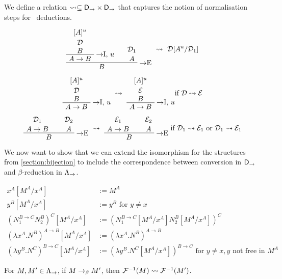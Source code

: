 \begin{definition}[Conversion]
We define a relation $\leadsto \subseteq \mathsf{D}_\to\times\mathsf{D}_\to$ that captures the notion of
normalisation steps for \implnpi\ deductions.

\[
  \AxiomC{$[A]^u$}
  \noLine
  \UnaryInfC{$\mathcal{D}$}
  \noLine
  \UnaryInfC{$B$}
  \RightLabel{$\to$I, $u$}
  \UnaryInfC{$A \to B$}
  \AxiomC{$\mathcal{D}_1$}
  \noLine
  \UnaryInfC{$A$}
  \RightLabel{$\to$E}
  \BinaryInfC{$B$}
  \DisplayProof
\ \leadsto\ \mathcal{D}[A^u/\mathcal{D}_1]
\]

\[
  \AxiomC{$[A]^u$}
  \noLine
  \UnaryInfC{$\mathcal{D}$}
  \noLine
  \UnaryInfC{$B$}
  \RightLabel{$\to$I, $u$}
  \UnaryInfC{$A \to B$}
  \DisplayProof
\ \leadsto\ 
  \AxiomC{$[A]^u$}
  \noLine
  \UnaryInfC{$\mathcal{E}$}
  \noLine
  \UnaryInfC{$B$}
  \RightLabel{$\to$I, $u$}
  \UnaryInfC{$A \to B$}
  \DisplayProof
\mbox{if } \mathcal{D} \leadsto \mathcal{E}
\]

\[
  \AxiomC{$\mathcal{D}_1$}
  \noLine
  \UnaryInfC{$A \to B$}
  \AxiomC{$\mathcal{D}_2$}
  \noLine
  \UnaryInfC{$A$}
  \RightLabel{$\to$E}
  \BinaryInfC{$B$}
  \DisplayProof
\ \leadsto\ 
  \AxiomC{$\mathcal{E}_1$}
  \noLine
  \UnaryInfC{$A \to B$}
  \AxiomC{$\mathcal{E}_2$}
  \noLine
  \UnaryInfC{$A$}
  \RightLabel{$\to$E}
  \BinaryInfC{$B$}
  \DisplayProof
\mbox{ if } \mathcal{D}_1 \leadsto \mathcal{E}_1
\mbox{ or } \mathcal{D}_1 \leadsto \mathcal{E}_1
\]
\end{definition}

We now want to show that we can extend the isomorphism for the structures from
\ref{section:bijection} to include the correspondence between conversion in
$\mathsf{D}_\to$ and $\beta$-reduction in $\Lambda_\to$.

\begin{definition}
\begin{align*}
x^A[M^A/x^A] & := M^A \\
y^B[M^A/x^A] & := y^B \mbox{ for } y \neq x \\
(N_1^{B \to C}N_2^{B})^C[M^A/x^A] & := (N_1^{B \to C}[M^A/x^A]N_2^{B}[M^A/x^A])^C \\
(\lambda x^A.N^B)^{A \to B}[M^A/x^A] & := (\lambda x^A.N^B)^{A \to B} \\
(\lambda y^B.N^C)^{B \to C}[M^A/x^A] & := (\lambda y^B.N^C[M^A/x^A])^{B \to C}
\mbox{ for } y \neq x, y \mbox{ not free in } M^A
\end{align*}
\end{definition}

\begin{proposition}
For $M, M' \in \Lambda_\to$, if $M \rightarrow_\beta M'$, then $\mathcal{F}^{-1}(M) \leadsto
\mathcal{F}^{-1}(M')$.
\end{proposition}


